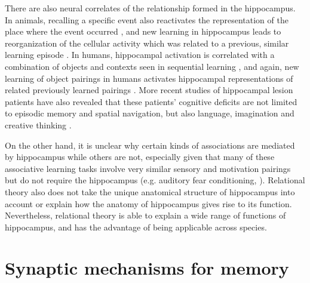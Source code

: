 There are also neural correlates of the relationship formed in the hippocampus. In animals, recalling a specific event also reactivates the representation of the place where the event occurred \citep{moita03, itskov11}, and new learning in hippocampus leads to reorganization of the cellular activity which was related to a previous, similar learning episode \citep{mckenzie13}. In humans, hippocampal activation is correlated with a combination of objects and contexts seen in sequential learning  \citep{hsieh14}, and again, new learning of object pairings in humans activates hippocampal representations of related previously learned pairings \citep{zeithamova12}. More recent studies of hippocampal lesion patients have also revealed that these patients' cognitive deficits are not limited to episodic memory and spatial navigation, but also language, imagination and creative thinking \citep{duff09, duff13}.


On the other hand, it is unclear why certain kinds of associations are mediated by hippocampus while others are not, especially given that many of these associative learning tasks involve very similar sensory and motivation pairings but do not require the hippocampus (e.g. auditory fear conditioning, \citep{phillips92}). Relational theory also does not take the unique anatomical structure of hippocampus into account or explain how the anatomy of hippocampus gives rise to its function. Nevertheless, relational theory is able to explain a wide range of functions of hippocampus, and has the advantage of being applicable across species.

\begin{comment} \todo{not sure if you decided to kill this section or haven't started it yet...}
\subsubsection{Conclusion}
\citep{opitz14} hpc and memory
\citep{shohamy13} hpc in cognition
\citep{huijgen15} hpc node of memory

\citep{lee16} lesion studies review
\citep{mcdonald13} memory to behaviour
\citep{middei14} hpc in learning disorder
\citep{eichenbaum14} hpc where vs episodic
\citep{sasaki15} hpc memory circuit
\end{comment}

\section{Synaptic mechanisms for memory}
